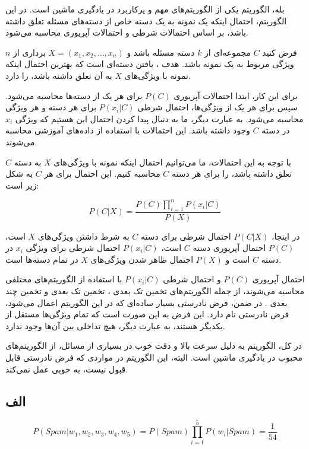 بله، الگوریتم
یکی از الگوریتم‌های مهم و پرکاربرد در یادگیری ماشین است. در این الگوریتم، احتمال اینکه یک نمونه به یک دسته خاص از دسته‌های مسئله تعلق داشته باشد، بر اساس احتمالات شرطی و احتمالات آپریوری محاسبه می‌شود.

فرض کنید
$C$
مجموعه‌ای از
$k$
دسته مسئله باشد و 
$X = (x_1, x_2, \dots, x_n)$
برداری از
$n$
ویژگی مربوط به یک نمونه باشد. هدف
، 
یافتن دسته‌ای است که بهترین احتمال اینکه نمونه با ویژگی‌های
$X$
 به آن تعلق داشته باشد، را دارد.

برای این کار، ابتدا احتمالات آپریوری 
$P(C)$
برای هر یک از دسته‌ها محاسبه می‌شود. سپس برای هر یک از ویژگی‌ها، احتمال شرطی 
$P(x_i|C)$
برای هر دسته و هر ویژگی محاسبه می‌شود. به عبارت دیگر، ما به دنبال پیدا کردن احتمال این هستیم که ویژگی 
$x_i$
در دسته 
$C$
وجود داشته باشد. این احتمالات با استفاده از داده‌های آموزشی محاسبه می‌شوند.

با توجه به این احتمالات، ما می‌توانیم احتمال اینکه نمونه با ویژگی‌های 
$X$
به دسته 
$C$
تعلق داشته باشد، را برای هر دسته 
$C$
محاسبه کنیم. این احتمال برای هر 
$C$
به شکل زیر است:

$$
P(C|X) = \frac{P(C) \prod_{i=1}^n P(x_i|C)}{P(X)}
$$

در اینجا، 
$P(C|X)$
احتمال شرطی برای دسته 
$C$
به شرط داشتن ویژگی‌های 
$X$
است، 
$P(C)$
احتمال آپریوری دسته 
$C$
است، 
$P(x_i|C)$
احتمال شرطی برای ویژگی 
$x_i$
در دسته 
$C$
است و 
$P(X)$
احتمال ظاهر شدن ویژگی‌های 
$X$
در تمام دسته‌ها است.

احتمال آپریوری 
$P(C)$
و احتمال شرطی 
$P(x_i|C)$
با استفاده از الگوریتم‌های مختلفی محاسبه می‌شوند، از جمله الگوریتم‌های تخمین تک بعدی
، تخمین تک بعدی 
و تخمین چند بعدی
.
در ضمن، فرض نادرستی بسیار ساده‌ای که در این الگوریتم اعمال می‌شود، فرض نادرستی
نام دارد. این فرض به این صورت است که تمام ویژگی‌ها مستقل از یکدیگر هستند، به عبارت دیگر، هیچ تداخلی بین آن‌ها وجود ندارد.

در کل، الگوریتم
به دلیل سرعت بالا و دقت خوب در بسیاری از مسائل، از الگوریتم‌های محبوب در یادگیری ماشین است. البته، این الگوریتم در مواردی که فرض نادرستی
قابل قبول نیست، به خوبی عمل نمی‌کند.

\subsection*{الف}


$$
P(Spam | w_1 , w_2 , w_3 , w_4 , w_5) = P(Spam) \prod_{i=1}^5 P(w_i | Spam) = \frac{1}{54} 
$$

